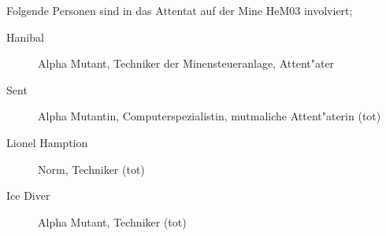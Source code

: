 
Folgende Personen sind in das Attentat auf der Mine HeM03 involviert;

\begin{description}
    \item[Hanibal] Alpha Mutant, Techniker der Minensteueranlage, Attent"ater
    \item[Sent] Alpha Mutantin, Computerspezialistin, mutma\3liche Attent"aterin (tot)
    \item[Lionel Hamption] Norm, Techniker (tot)
    \item[Ice Diver] Alpha Mutant, Techniker (tot) 
\end{description}
